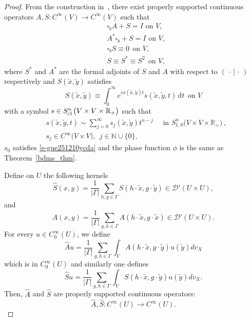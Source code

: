 \documentclass{article}
\newcommand{\mcd}{\mathcal D}
\newcommand{\To}{\rightarrow}
\begin{document}
\begin{proof}
From the construction in~\cite[part I, Chapter 8]{hsiao1}, there exist properly supported continuous operators 
		$A, S: C^\infty(V)\To C^\infty(V)$  such that
		\begin{equation}\label{e-gue140205II}
			\begin{split}
				&\mbox{$\square_bA+S=I$ on $V$},\\
                &\mbox{$A^*\square_b+S=I$ on $V$},\\
				&\square_bS\equiv0\ \ \mbox{on $V$},\\
				&S\equiv S^*\equiv S^2\ \ \mbox{on $V$},
			\end{split}
		\end{equation}
		where $S^*$ and $A^*$ are the formal adjoints of $S$ and $A$
		with respect to $(\,\cdot\,|\,\cdot\,)$ respectively and $S(\widetilde{x},\widetilde{y})$ satisfies
		\begin{equation}\label{e-gue240309yyd}
  S(\widetilde{x}, \widetilde{y})\equiv\int^{\infty}_{0}e^{i\phi(\widetilde{x}, \widetilde{y})t}s(\widetilde{x}, \widetilde{y}, t)\,\mathrm{d}t\ \ \mbox{on $V$}\end{equation}
		with a symbol $s\in S^{n}_{{\rm cl\,}}\big(V\times V\times\mathbb{R}_+\big)$  such that
		\begin{equation}  \label{e-gue140205III}\begin{split}
				&s(\widetilde{x}, \widetilde{y}, t)\sim\sum^\infty_{j=0}s_j(\widetilde{x}, \widetilde{y})t^{n-j}\quad\text{ in }S^{n}_{1, 0}
				\big(V\times V\times\mathbb{R}_+\big)\,,\\
				&s_j\in C^\infty\big(V\times V\big),\ \ j\in\mathbb N\cup\{0\},
		\end{split}\end{equation}
        $s_0$ satisfies \eqref{e-gue251210ycda} 
		and the phase function $\phi$ is the same as Theorem~\ref{bdms_thm}.  

        Define on $U$ the following kernels
	\[
		\hat{S}({x},{y})=\frac{1}{|\Gamma|}\sum_{h,g\in\Gamma}S(h\cdot\widetilde{x},g\cdot \widetilde{y})\in\mcd'(U\times U),\]
	and
	\[\hat{A}(x,y)=\frac{1}{|\Gamma|}\sum_{g,h\in\Gamma} A( h\cdot\widetilde{x},g\cdot \widetilde{x})\in\mcd'(U\times U). \]
	 For every $u \in C^\infty_0(U)$, we define
	\[\hat{A}u=\frac{1}{|\Gamma|}\sum_{g,h\in\Gamma}\int_{V} A( h\cdot\widetilde{x},g\cdot \widetilde{y})u(\widetilde{y})dv_X\]
	which is in $C^\infty_0(U)$ and similarly one defines 
    \[\hat{S}u=\frac{1}{|\Gamma|}\sum_{g,h\in\Gamma}\int_{V} S( h\cdot\widetilde{x},g\cdot \widetilde{y})u(\widetilde{y})dv_X.\]
    Then, $\hat A$ and $\hat S$ are properly supported continuous operators:
    \[\hat A, \hat S: C^\infty(U)\To C^\infty(U).\]
    

\end{proof}
\end{document}
